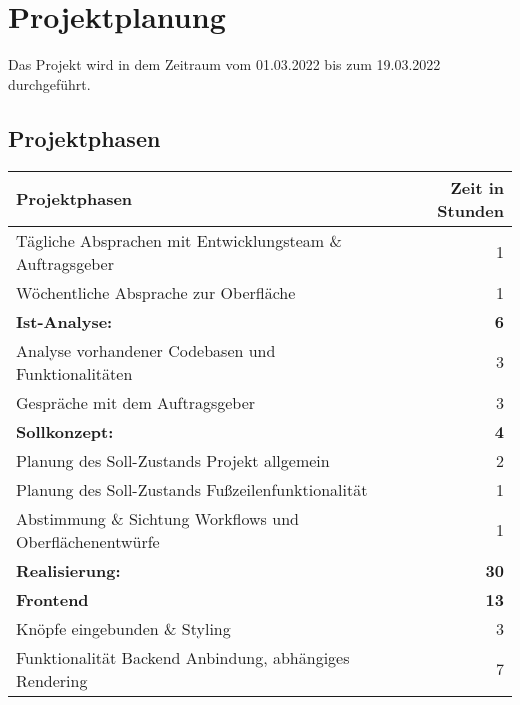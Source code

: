 \newpage
\section{Projektplanung}
\label{projektplanung}
Das Projekt wird in dem Zeitraum vom 01.03.2022 bis zum 19.03.2022 durchgeführt. %

\subsection{Projektphasen}
\label{projektphasen}

{
\begin{tabular}{|l|r|}
	\hline
	\textbf{Projektphasen }                                   & \textbf{Zeit in Stunden} \\ \hline
	Tägliche Absprachen mit Entwicklungsteam \& Auftragsgeber &                        1 \\
	Wöchentliche Absprache zur Oberfläche                     &                        1 \\
	\textbf{Ist-Analyse: }                                    &               \textbf{6} \\
	Analyse vorhandener Codebasen und Funktionalitäten        &                        3 \\
	Gespräche mit dem Auftragsgeber                           &                        3 \\
	\textbf{Sollkonzept:  }                                   &               \textbf{4} \\
	Planung des Soll-Zustands Projekt allgemein               &                        2 \\
	Planung des Soll-Zustands Fußzeilenfunktionalität         &                        1 \\
	Abstimmung \& Sichtung Workflows und Oberflächenentwürfe  &                        1 \\
	\textbf{Realisierung: }                                   &              \textbf{30} \\
	\textbf{Frontend  }                                       &              \textbf{13} \\
	Knöpfe eingebunden \& Styling                             &                        3 \\
	Funktionalität Backend Anbindung, abhängiges Rendering    &                        7 \\

\end{tabular}}

